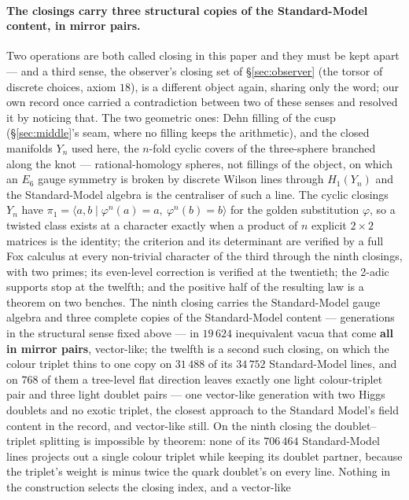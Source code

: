 \documentclass[11pt,a4paper]{article}
\theoremstyle{definition}
\theoremstyle{remark}
\begin{document}
\paragraph{The closings carry three structural copies of the Standard-Model content, in mirror pairs.} Two operations
are both called closing in this paper and they must be kept apart --- and a third sense, the observer's
closing set of \S\ref{sec:observer} (the torsor of discrete choices, axiom $18$), is a different object again, sharing
only the word; our own record once carried a contradiction between two of these senses and resolved it by noticing
that. The two geometric ones: Dehn filling of the cusp (\S\ref{sec:middle}'s seam,
where no filling keeps the arithmetic), and the closed manifolds $Y_n$ used here, the $n$-fold cyclic covers of the
three-sphere branched along the knot --- rational-homology spheres, not fillings of the object, on which an $E_6$ gauge
symmetry is broken by discrete Wilson lines through $H_1(Y_n)$ and the Standard-Model algebra is the centraliser of such a
line. The cyclic closings $Y_n$ have
$\pi_1 = \langle a, b \mid \varphi^n(a) = a,\ \varphi^n(b) = b\rangle$ for the golden substitution $\varphi$, so a
twisted class exists at a character exactly when a product of $n$ explicit $2 \times 2$ matrices is the identity;
the criterion and its determinant are verified by a full Fox calculus at every non-trivial character of the third
through the ninth closings, with two primes; its even-level correction is verified at the twentieth; the 2-adic
supports stop at the twelfth; and the positive half of the resulting law is a theorem on two benches. The ninth
closing carries the Standard-Model gauge algebra and three complete copies of the Standard-Model content ---
generations in the structural sense fixed above --- in $19\,624$ inequivalent vacua that come \textbf{all in
mirror pairs}, vector-like; the twelfth is a second such closing, on which the colour triplet thins to one copy on $31\,488$ of its $34\,752$ Standard-Model lines, and on $768$ of them a tree-level flat direction leaves exactly one light colour-triplet pair and three light doublet pairs --- one vector-like generation with two Higgs doublets and no exotic triplet, the closest approach to the Standard Model's field content in the record, and vector-like still. On the ninth closing the doublet--triplet splitting is impossible by theorem: none of its $706\,464$ Standard-Model lines projects out a single colour triplet while keeping its doublet partner, because the triplet's weight is minus twice the quark doublet's on every line. Nothing in the construction selects the closing index, and a vector-like
\end{document}
